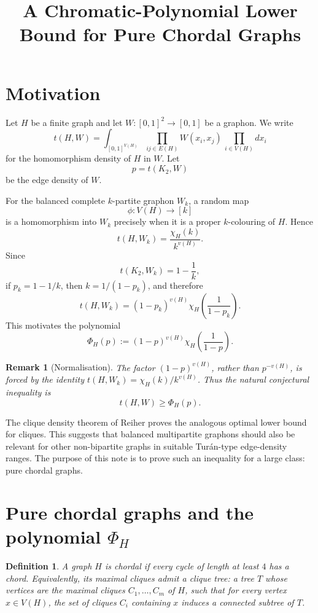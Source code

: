 \documentclass[11pt]{article}
\title{A Chromatic-Polynomial Lower Bound for Pure Chordal Graphs}
\author{}
\date{}
\newtheorem{remark}{Remark}
\newtheorem{definition}{Definition}
\newcommand{\K}{K}
\begin{document}
\maketitle

\section{Motivation}

Let \(H\) be a finite graph and let \(W\colon [0,1]^2\to[0,1]\) be a graphon.
We write
\[
t(H,W)
=
\int_{[0,1]^{V(H)}}
\prod_{ij\in E(H)} W(x_i,x_j)\,
\prod_{i\in V(H)} dx_i
\]
for the homomorphism density of \(H\) in \(W\). Let
\[
p=t(\K_2,W)
\]
be the edge density of \(W\).

For the balanced complete \(k\)-partite graphon \(W_k\), a random map
\[
\phi\colon V(H)\to [k]
\]
is a homomorphism into \(W_k\) precisely when it is a proper \(k\)-colouring of
\(H\). Hence
\[
t(H,W_k)=\frac{\chi_H(k)}{k^{v(H)}}.
\]
Since
\[
t(\K_2,W_k)=1-\frac1k,
\]
if \(p_k=1-1/k\), then \(k=1/(1-p_k)\), and therefore
\[
t(H,W_k)
=
(1-p_k)^{v(H)}
\chi_H\!\left(\frac1{1-p_k}\right).
\]
This motivates the polynomial
\[
\Phi_H(p)
:=
(1-p)^{v(H)}
\chi_H\!\left(\frac1{1-p}\right).
\]

\begin{remark}[Normalisation]
The factor \((1-p)^{v(H)}\), rather than \(p^{-v(H)}\), is forced by the identity
\(t(H,W_k)=\chi_H(k)/k^{v(H)}\). Thus the natural conjectural inequality is
\[
t(H,W)\ge \Phi_H(p).
\]
\end{remark}

The clique density theorem of Reiher proves the analogous optimal lower bound
for cliques. This suggests that balanced multipartite graphons should also be
relevant for other non-bipartite graphs in suitable Turán-type edge-density
ranges. The purpose of this note is to prove such an inequality for a large class:
pure chordal graphs.

\section{Pure chordal graphs and the polynomial \(\Phi_H\)}

\begin{definition}
A graph \(H\) is \emph{chordal} if every cycle of length at least \(4\) has a
chord. Equivalently, its maximal cliques admit a \emph{clique tree}: a tree \(T\)
whose vertices are the maximal cliques \(C_1,\dots,C_m\) of \(H\), such that for
every vertex \(x\in V(H)\), the set of cliques \(C_i\) containing \(x\) induces a
connected subtree of \(T\).
\end{definition}
\end{document}
